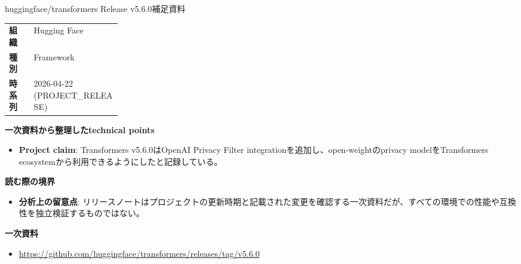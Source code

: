 \begin{technicalnote}{huggingface/transformers Release v5.6.0}{補足資料}
\begingroup
\begin{tabularx}{\linewidth}{@{}>{\bfseries}p{0.22\linewidth}X@{}}
組織 & Hugging Face \\
種別 & Framework \\
時系列 & 2026-04-22 (PROJECT\_RELEASE) \\
\end{tabularx}
\smallskip
{\bfseries 一次資料から整理したtechnical points}
\begin{itemize}[leftmargin=1.5em,itemsep=0.35em]
\item \textbf{Project claim}: Transformers v5.6.0はOpenAI Privacy Filter integrationを追加し、open-weightのprivacy modelをTransformers ecosystemから利用できるようにしたと記録している。
\end{itemize}
{\bfseries 読む際の境界}
\begin{itemize}[leftmargin=1.5em,itemsep=0.35em]
\item \textbf{分析上の留意点}: リリースノートはプロジェクトの更新時期と記載された変更を確認する一次資料だが、すべての環境での性能や互換性を独立検証するものではない。
\end{itemize}
\begin{samepage}
{\bfseries 一次資料}
\begingroup\sloppy
\begin{itemize}[leftmargin=1.5em,itemsep=0.25em]
\item {\scriptsize\url{https://github.com/huggingface/transformers/releases/tag/v5.6.0}}
\end{itemize}
\endgroup
\end{samepage}
\endgroup
\end{technicalnote}
\medskip


